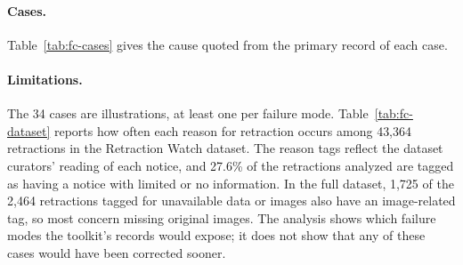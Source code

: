 \paragraph{Cases.} Table~\ref{tab:fc-cases} gives the cause quoted from the primary record of
each case.



\paragraph{Limitations.} The 34 cases are illustrations, at least one per failure mode.
Table~\ref{tab:fc-dataset} reports how often each reason for retraction occurs among 43,364
retractions in the Retraction Watch dataset. The reason tags reflect the dataset curators' reading of each notice, and
27.6\% of the retractions analyzed are tagged as having a notice with limited or no information.
In the full dataset, 1,725 of the 2,464 retractions tagged for unavailable data or images also
have an image-related tag, so most concern missing original images. The analysis shows which
failure modes the toolkit's records would expose; it does not show that any of these
cases would have been corrected sooner.
